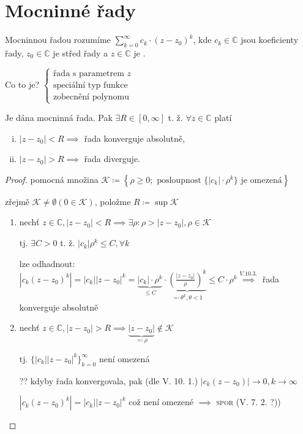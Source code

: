 \section{Mocninné řady}

\begin{definice}
    Mocninnou řadou rozumíme $\sum_{k=0}^{\infty}c_k\cdot(z-z_0)^k$, kde $c_k \in \mathbb C$ jsou koeficienty řady, $z_0 \in \mathbb C$ je střed řady a $z \in \mathbb C$ je .
\end{definice}

\begin{poznamka}
    Co to je? $\begin{cases}\text{řada s parametrem } z \\ \text{speciální typ funkce} \\ \text{zobecnění polynomu} \end{cases}$
\end{poznamka}

\begin{veta} Je dána mocninná řada. Pak $\exists R \in [0, \infty]$ t. ž. $\forall z \in \mathbb C$ platí
\begin{enumerate}[i)]
  \item $|z-z_0|<R \implies$ řada konverguje absolutně,
  \item $|z-z_0|>R \implies$ řada diverguje.
\end{enumerate}
\end{veta}

\begin{proof}
    pomocná množina $\mathscr K \coloneq \left\{\rho \geq 0; \text{ posloupnost } \{|c_k|\cdot \rho^k\}\text{ je omezená}\right\}$

    zřejmě $\mathscr K \neq \emptyset (0 \in \mathscr K)$, položme $R\coloneq \sup \mathscr K$
    \begin{enumerate}[{ad} i)]
        \item nechť $z \in \mathbb C, |z-z_0|<R\implies\exists \rho: \rho >|z-z_0|, \rho \in \mathscr K$

            tj. $\exists C>0$ t. ž. $|c_k|\rho^k\leq C, \forall k$

            lze odhadnout: $|c_k(z-z_0)^k|=|c_k||z-z_0|^k = \underbrace{|c_k|\cdot\rho^k}_{\leq C}\cdot\underbrace{(\frac{|z-z_0|}{\rho})^k}_{\eqcolon \theta^k, \theta <1}\leq C \cdot \rho^k \stackrel{V. 10. 3.}{\implies}$ řada konverguje absolutně
        \item nechť $z \in \mathbb C, |z-z_0|>R\implies\underbrace{|z-z_0|}_{\eqcolon \rho}\notin \mathscr K$

            tj. $\{|c_k||z-z_0|^k\}_{k=0}^\infty$ není omezená

            ?? kdyby řada konvergovala, pak (dle V. 10. 1.) $|c_k(z-z_0)|\to 0, k \to \infty$

            $|c_k(z-z_0)^k|=|c_k||z-z_0|^k$ což není omezené $\implies$ \textsc{spor} \Lightning (V. 7. 2. ?))
    \end{enumerate}
\end{proof}

